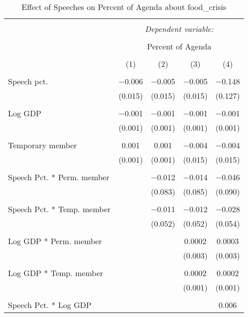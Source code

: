
\begin{table}[!htbp] \centering 
  \caption{Effect of Speeches on Percent of Agenda about  food_crisis} 
  \label{} 
\begin{tabular}{@{\extracolsep{5pt}}lcccc} 
\\[-1.8ex]\hline 
\hline \\[-1.8ex] 
 & \multicolumn{4}{c}{\textit{Dependent variable:}} \\ 
\cline{2-5} 
\\[-1.8ex] & \multicolumn{4}{c}{Percent of Agenda} \\ 
\\[-1.8ex] & (1) & (2) & (3) & (4)\\ 
\hline \\[-1.8ex] 
 Speech pct. & $-$0.006 & $-$0.005 & $-$0.005 & $-$0.148 \\ 
  & (0.015) & (0.015) & (0.015) & (0.127) \\ 
  & & & & \\ 
 Log GDP & $-$0.001 & $-$0.001 & $-$0.001 & $-$0.001 \\ 
  & (0.001) & (0.001) & (0.001) & (0.001) \\ 
  & & & & \\ 
 Temporary member & 0.001 & 0.001 & $-$0.004 & $-$0.004 \\ 
  & (0.001) & (0.001) & (0.015) & (0.015) \\ 
  & & & & \\ 
 Speech Pct. * Perm. member &  & $-$0.012 & $-$0.014 & $-$0.046 \\ 
  &  & (0.083) & (0.085) & (0.090) \\ 
  & & & & \\ 
 Speech Pct. * Temp. member &  & $-$0.011 & $-$0.012 & $-$0.028 \\ 
  &  & (0.052) & (0.052) & (0.054) \\ 
  & & & & \\ 
 Log GDP * Perm. member &  &  & 0.0002 & 0.0003 \\ 
  &  &  & (0.003) & (0.003) \\ 
  & & & & \\ 
 Log GDP * Temp. member &  &  & 0.0002 & 0.0002 \\ 
  &  &  & (0.001) & (0.001) \\ 
  & & & & \\ 
 Speech Pct. * Log GDP &  &  &  & 0.006 \\ 

\end{tabular}
\end{table}

